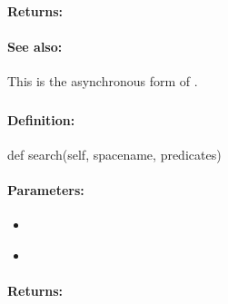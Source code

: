 \paragraph{Returns:}


\paragraph{See also:}  This is the asynchronous form of .

\pagebreak
\subsubsection{}
\label{api:python:search}


\paragraph{Definition:}
\begin{pythoncode}
def search(self, spacename, predicates)
\end{pythoncode}

\paragraph{Parameters:}
\begin{itemize}[noitemsep]
\item {}\\

\item {}\\

\end{itemize}

\paragraph{Returns:}


\pagebreak
\subsubsection{}
\label{api:python:search_describe}


